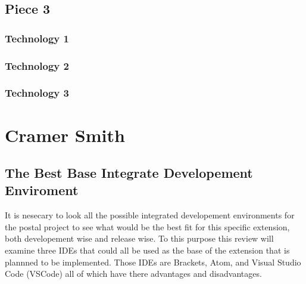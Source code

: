 \documentclass[letterpaper,10pt,titlepage,draftclsnofoot,onecolumn,onesided] {IEEEtran}
\begin{document}
\subsection{Piece 3}
\subsubsection{Technology 1}
\subsubsection{Technology 2}
\subsubsection{Technology 3}


\section{Cramer Smith}
%
\subsection{The Best Base Integrate Developement Enviroment} 
It is nesecary to look all the possible integrated developement environments for the postal project to see what would be the best fit for this specific extension, both developement wise and release wise.
To this purpose this review will examine three IDEs that could all be used as the base of the extension that is plannned to be implemented.
Those IDEs are Brackets, Atom, and Visual Studio Code (VSCode) all of which have there advantages and disadvantages.
\end{document}
